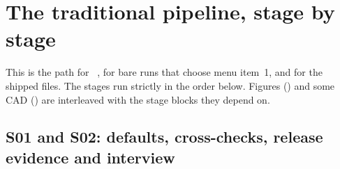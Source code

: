 \section{The traditional pipeline, stage by stage}\label{sec:df-pipeline}

This is the path for ~\code{[flags]}, for bare runs that choose menu item~1, and for the shipped  files. The stages run strictly in the order below. Figures (\leavevmode{}) and some CAD (\leavevmode{}) are interleaved with the stage blocks they depend on.

\subsection{S01 and S02: defaults, cross-checks, release evidence and interview}\label{sec:df-s01s02}
